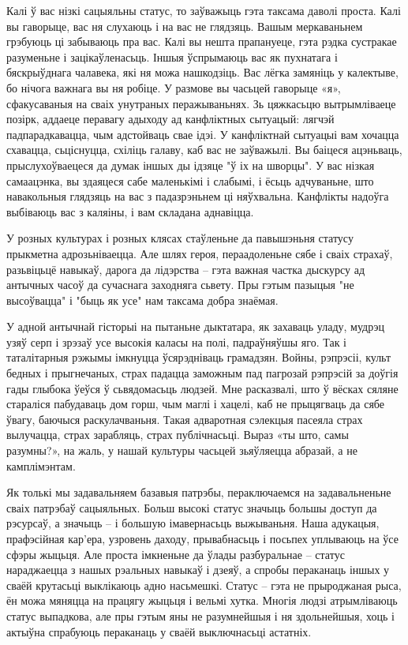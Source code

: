 Калі ў вас нізкі сацыяльны статус, то заўважыць гэта таксама даволі проста. Калі вы гаворыце, вас ня слухаюць і на вас не глядзяць. Вашым меркаваньнем грэбуюць ці забываюць пра вас. Калі вы нешта прапануеце, гэта рэдка сустракае разуменьне і зацікаўленасьць. Іншыя ўспрымаюць вас як пухнатага і бяскрыўднага чалавека, які ня можа нашкодзіць. Вас лёгка замяніць у калектыве, бо нічога важнага вы ня робіце. У размове вы часьцей гаворыце «я», сфакусаваныя на сваіх унутраных перажываньнях. Зь цяжкасьцю вытрымліваеце позірк, аддаеце перавагу адыходу ад канфліктных сытуацый: лягчэй падпарадкавацца, чым адстойваць свае ідэі. У канфліктнай сытуацыі вам хочацца схавацца, сьціснуцца, схіліць галаву, каб вас не заўважылі. Вы баіцеся ацэньваць, прыслухоўваецеся да думак іншых ды ідзяце "ў іх на шворцы". У вас нізкая самаацэнка, вы здаяцеся сабе маленькімі і слабымі, і ёсьць адчуваньне, што навакольныя глядзяць на вас з падазрэньнем ці няўхвальна. Канфлікты надоўга выбіваюць вас з каляіны, і вам складана аднавіцца.

У розных культурах і розных клясах стаўленьне да павышэньня статусу прыкметна адрозьніваецца. Але шлях героя, пераадоленьне сябе і сваіх страхаў, разьвіцьцё навыкаў, дарога да лідэрства – гэта важная частка дыскурсу ад антычных часоў да сучаснага заходняга сьвету. Пры гэтым пазыцыя "не высоўвацца" і "быць як усе" нам таксама добра знаёмая.

У адной антычнай гісторыі на пытаньне дыктатара, як захаваць уладу, мудрэц узяў серп і зрэзаў усе высокія каласы на полі, падраўняўшы яго. Так і таталітарныя рэжымы імкнуцца ўсярэдніваць грамадзян. Войны, рэпрэсіі, культ бедных і прыгнечаных, страх падацца заможным пад пагрозай рэпрэсій за доўгія гады глыбока ўеўся ў сьвядомасьць людзей. Мне расказвалі, што ў вёсках сяляне стараліся пабудаваць дом горш, чым маглі і хацелі, каб не прыцягваць да сябе ўвагу, баючыся раскулачваньня. Такая адваротная сэлекцыя пасеяла страх вылучацца, страх зарабляць, страх публічнасьці. Выраз «ты што, самы разумны?», на жаль, у нашай культуры часьцей зьяўляецца абразай, а не камплімэнтам.

Як толькі мы задавальняем базавыя патрэбы, пераключаемся на задавальненьне сваіх патрэбаў сацыяльных. Больш высокі статус значыць большы доступ да рэсурсаў, а значыць – і большую імавернасьць выжываньня. Наша адукацыя, прафэсійная кар'ера, узровень даходу, прывабнасьць і посьпех уплываюць на ўсе сфэры жыцьця. Але проста імкненьне да ўлады разбуральнае – статус нараджаецца з нашых рэальных навыкаў і дзеяў, а спробы пераканаць іншых у сваёй крутасьці выклікаюць адно насьмешкі. Статус – гэта не прыроджаная рыса, ён можа мяняцца на працягу жыцьця і вельмі хутка. Многія людзі атрымліваюць статус выпадкова, але пры гэтым яны не разумнейшыя і ня здольнейшыя, хоць і актыўна спрабуюць пераканаць у сваёй выключнасьці астатніх.

